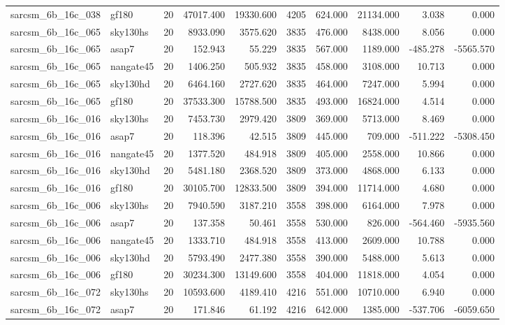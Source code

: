 \begin{longtable}{llrrrrrrrr}
sarcsm\_6b\_16c\_038 & gf180 & 20 & 47017.400 & 19330.600 & 4205 & 624.000 & 21134.000 & 3.038 & 0.000 \\
sarcsm\_6b\_16c\_065 & sky130hs & 20 & 8933.090 & 3575.620 & 3835 & 476.000 & 8438.000 & 8.056 & 0.000 \\
sarcsm\_6b\_16c\_065 & asap7 & 20 & 152.943 & 55.229 & 3835 & 567.000 & 1189.000 & -485.278 & -5565.570 \\
sarcsm\_6b\_16c\_065 & nangate45 & 20 & 1406.250 & 505.932 & 3835 & 458.000 & 3108.000 & 10.713 & 0.000 \\
sarcsm\_6b\_16c\_065 & sky130hd & 20 & 6464.160 & 2727.620 & 3835 & 464.000 & 7247.000 & 5.994 & 0.000 \\
sarcsm\_6b\_16c\_065 & gf180 & 20 & 37533.300 & 15788.500 & 3835 & 493.000 & 16824.000 & 4.514 & 0.000 \\
sarcsm\_6b\_16c\_016 & sky130hs & 20 & 7453.730 & 2979.420 & 3809 & 369.000 & 5713.000 & 8.469 & 0.000 \\
sarcsm\_6b\_16c\_016 & asap7 & 20 & 118.396 & 42.515 & 3809 & 445.000 & 709.000 & -511.222 & -5308.450 \\
sarcsm\_6b\_16c\_016 & nangate45 & 20 & 1377.520 & 484.918 & 3809 & 405.000 & 2558.000 & 10.866 & 0.000 \\
sarcsm\_6b\_16c\_016 & sky130hd & 20 & 5481.180 & 2368.520 & 3809 & 373.000 & 4868.000 & 6.133 & 0.000 \\
sarcsm\_6b\_16c\_016 & gf180 & 20 & 30105.700 & 12833.500 & 3809 & 394.000 & 11714.000 & 4.680 & 0.000 \\
sarcsm\_6b\_16c\_006 & sky130hs & 20 & 7940.590 & 3187.210 & 3558 & 398.000 & 6164.000 & 7.978 & 0.000 \\
sarcsm\_6b\_16c\_006 & asap7 & 20 & 137.358 & 50.461 & 3558 & 530.000 & 826.000 & -564.460 & -5935.560 \\
sarcsm\_6b\_16c\_006 & nangate45 & 20 & 1333.710 & 484.918 & 3558 & 413.000 & 2609.000 & 10.788 & 0.000 \\
sarcsm\_6b\_16c\_006 & sky130hd & 20 & 5793.490 & 2477.380 & 3558 & 390.000 & 5488.000 & 5.613 & 0.000 \\
sarcsm\_6b\_16c\_006 & gf180 & 20 & 30234.300 & 13149.600 & 3558 & 404.000 & 11818.000 & 4.054 & 0.000 \\
sarcsm\_6b\_16c\_072 & sky130hs & 20 & 10593.600 & 4189.410 & 4216 & 551.000 & 10710.000 & 6.940 & 0.000 \\
sarcsm\_6b\_16c\_072 & asap7 & 20 & 171.846 & 61.192 & 4216 & 642.000 & 1385.000 & -537.706 & -6059.650 \\

\end{longtable}
